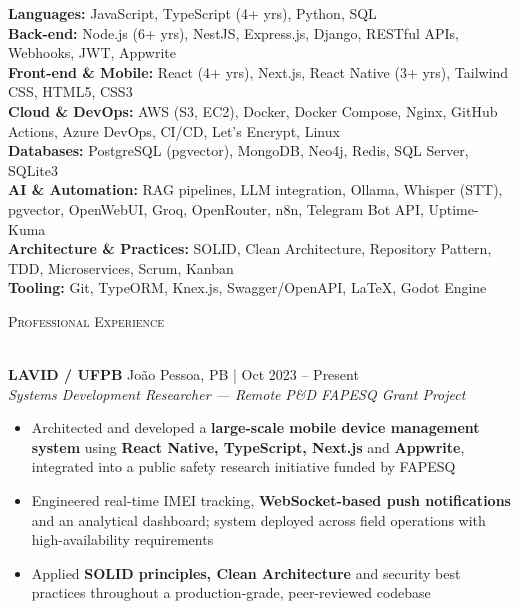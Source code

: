\documentclass[a4paper]{article}
\newcommand{\lineunder}{
    \vspace*{-8pt} \\
    \hspace*{-18pt} \hrulefill \\
}
\newcommand{\header}[1]{
    {\hspace*{-18pt}\vspace*{6pt} \textsc{#1}}
    \vspace*{-6pt} \lineunder
}
\begin{document}
\textbf{Languages:} JavaScript, TypeScript (4+ yrs), Python, SQL\\
\vspace{1mm}
\textbf{Back-end:} Node.js (6+ yrs), NestJS, Express.js, Django, RESTful APIs, Webhooks, JWT, Appwrite\\
\vspace{1mm}
\textbf{Front-end \& Mobile:} React (4+ yrs), Next.js, React Native (3+ yrs), Tailwind CSS, HTML5, CSS3\\
\vspace{1mm}
\textbf{Cloud \& DevOps:} AWS (S3, EC2), Docker, Docker Compose, Nginx, GitHub Actions, Azure DevOps, CI/CD, Let's Encrypt, Linux\\
\vspace{1mm}
\textbf{Databases:} PostgreSQL (pgvector), MongoDB, Neo4j, Redis, SQL Server, SQLite3\\
\vspace{1mm}
\textbf{AI \& Automation:} RAG pipelines, LLM integration, Ollama, Whisper (STT), pgvector, OpenWebUI, Groq, OpenRouter, n8n, Telegram Bot API, Uptime-Kuma\\
\vspace{1mm}
\textbf{Architecture \& Practices:} SOLID, Clean Architecture, Repository Pattern, TDD, Microservices, Scrum, Kanban\\
\vspace{1mm}
\textbf{Tooling:} Git, TypeORM, Knex.js, Swagger/OpenAPI, LaTeX, Godot Engine\\

\vspace{3mm}

\header{Professional Experience}
\vspace{2mm}

\textbf{LAVID / UFPB} \hfill Jo\~{a}o Pessoa, PB | Oct 2023 -- Present\\
\textit{Systems Development Researcher — Remote} \hfill \textit{P\&D FAPESQ Grant Project}\\
\vspace{-3mm}
\begin{itemize}[leftmargin=*, itemsep=-3pt]
    \item Architected and developed a \textbf{large-scale mobile device management system} using \textbf{React Native, TypeScript, Next.js} and \textbf{Appwrite}, integrated into a public safety research initiative funded by FAPESQ
    \item Engineered real-time IMEI tracking, \textbf{WebSocket-based push notifications} and an analytical dashboard; system deployed across field operations with high-availability requirements
    \item Applied \textbf{SOLID principles, Clean Architecture} and security best practices throughout a production-grade, peer-reviewed codebase
\end{itemize}
\end{document}
